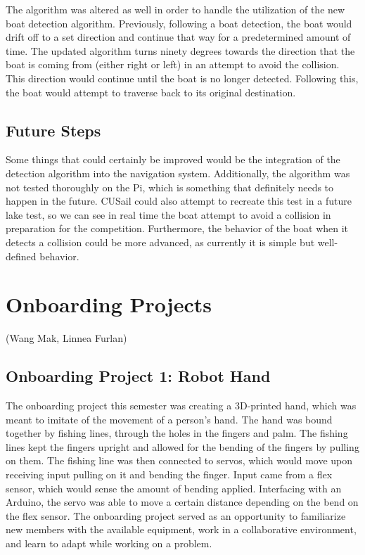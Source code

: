 \documentclass{article}
\begin{document}
The algorithm was altered as well in order to handle the utilization of the new boat detection algorithm. Previously, following a boat detection, the boat would drift off to a set direction and continue that way for a predetermined amount of time. The updated algorithm turns ninety degrees towards the direction that the boat is coming from (either right or left) in an attempt to avoid the collision. This direction would continue until the boat is no longer detected. Following this, the boat would attempt to traverse back to its original destination.

\subsection{Future Steps}
Some things that could certainly be improved would be the integration of the detection algorithm into the navigation system. Additionally, the algorithm was not tested thoroughly on the Pi, which is something that definitely needs to happen in the future. CUSail could also attempt to recreate this test in a future lake test, so we can see in real time the boat attempt to avoid a collision in preparation for the competition. Furthermore, the behavior of the boat when it detects a collision could be more advanced, as currently it is simple but well-defined behavior. 

\section{Onboarding Projects}
(Wang Mak, Linnea Furlan)
\subsection{Onboarding Project 1: Robot Hand}
The onboarding project this semester was creating a 3D-printed hand, which was meant to imitate of the movement of a person's hand. The hand was bound together by fishing lines, through the holes in the fingers and palm. The fishing lines kept the fingers upright and allowed for the bending of the fingers by pulling on them. The fishing line was then connected to servos, which would move upon receiving input pulling on it and bending the finger. Input came from a flex sensor, which would sense the amount of bending applied. Interfacing with an Arduino, the servo was able to move a certain distance depending on the bend on the flex sensor. The onboarding project served as an opportunity to familiarize new members with the available equipment, work in a collaborative environment, and learn to adapt while working on a problem.
\end{document}
